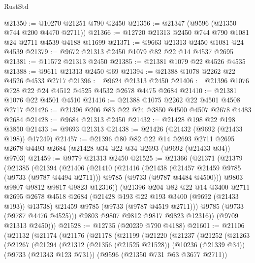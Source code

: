 \begin{lexlean}{RustStd}
\begin{coremodule}
@21350 := @10270 @21251 @790 @2450
@21356 := @21347 (@9596 (@21350 @744 @200 @4470 @2711))
@21366 := @12720 @21313 @2450 @744 @790 @1081 @24 @2711 @4539 @4188 @11699
@21371 := @9663 @21313 @2450 @1081 @24 @4539
@21379 := @9672 @21313 @2450 @1079 @82 @22 @14 @4537 @2695
@21381 := @11572 @21313 @2450
@21385 := @21381 @1079 @22 @4526 @4535
@21388 := @9611 @21313 @2450 @69
@21394 := @21388 @1078 @2262 @22 @4526 @4533 @2717
@21396 := @9624 @21313 @2450
@21406 := @21396 @1076 @728 @22 @24 @4512 @4525 @4532 @2678 @4475 @2684
@21410 := @21381 @1076 @22 @4501 @4510
@21416 := @21388 @1075 @2262 @22 @4501 @4508 @2717
@21426 := @21396 @206 @83 @22 @24 @3850 @4500 @4507 @2678 @4483 @2684
@21428 := @9684 @21313 @2450
@21432 := @21428 @198 @22 @198 @3850
@21433 := @9693 @21313
@21438 := @21426 (@21432 (@9692 (@21433 @198)) @17249)
@21457 := @21396
    @80
    @82
    @22
    @14
    @2693
    @2711
    @2695
    @2678
    @4493
    @2684
    (@21428 @34 @22 @34 @2693 (@9692 (@21433 @34)) @9703)
@21459 := @9779 @21313 @2450
@21525 := @21366
    (@21371
      (@21379
        (@21385
          (@21394
            (@21406
              (@21410
                (@21416
                  (@21438
                    (@21457 @21459 @9785 (@9733 (@9787 @4494 @2711)))
                    @9785
                    (@9733 (@9787 @4484 @4500)))
                  @9803
                  @9807
                  @9812
                  @9817
                  @9823
                  @12316))
              (@21396
                @204
                @82
                @22
                @14
                @3400
                @2711
                @2695
                @2678
                @4518
                @2684
                (@21428 @193 @22 @193 @3400 (@9692 (@21433 @193)) @13738)
                @21459
                @9785
                (@9733 (@9787 @4519 @2711)))
              @9785
              (@9733 (@9787 @4476 @4525)))
            @9803
            @9807
            @9812
            @9817
            @9823
            @12316))
        (@9709 @21313 @2450)))
@21528 := @12735 (@20239 @790 @4188)
@21601 := @21106
    (@21132
      (@21174
        (@21176
          (@21178
            (@21199
              (@21220
                (@21237
                  (@21252
                    (@21263
                      (@21267
                        (@21294
                          (@21312
                            (@21356 (@21525 @21528))
                            (@10236 (@21339 @34))
                            (@9733 (@21343 @123 @731))
                            (@9596 (@21350 @731 @63 @3677 @2711))

\end{coremodule}
\end{lexlean}
